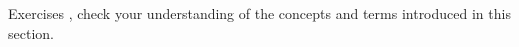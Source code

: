 {\noindent Exercises}
{, check your understanding of the concepts and terms introduced in this section.}
